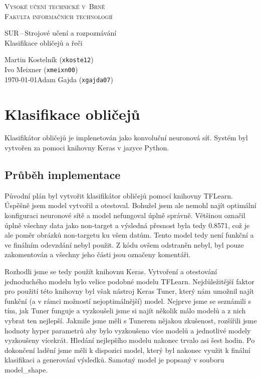 \documentclass[a4paper,11pt]{article}
\begin{document}
	\begin{titlepage}
		\begin{center}
			\textsc{\Huge Vysoké učení technické v~Brně\\
				\vspace{0.4em}\huge Fakulta informačních technologií}
			
			
			{\LARGE SUR\,--\,Strojové učení a rozpoznávání\\
				\Huge Klasifikace obličejů a řeči\\ \vspace{0.3em}}
			
			
			{\Large \hfill Martin Kostelník (\texttt{xkoste12})}\\
			{\Large \hfill Ivo Meixner (\texttt{xmeixn00})}\\
			{\Large \today \hfill Adam Gajda (\texttt{xgajda07})}
		\end{center}
	\end{titlepage}

	\section{Klasifikace obličejů}

		Klasifikátor obličejů je implenetován jako konvoluční neuronová síť. Systém byl vytvořen za pomoci knihovny Keras v jazyce Python.

		\subsection {Průběh implementace}
			Původní plán byl vytvořit klasifikátor obličejů pomocí knihovny TFLearn. Úspěšně jsem model vytvořil a otestoval. Bohužel jsem ale nemohl najít optimální konfiguraci neuronové sítě a model nefungoval úplně správně. Většinou označil úplně všechny data jako non-target a výsledná přesnost byla tedy 0.8571, což je ale poměr obrázků non-targetu ku všem datům. Tento model tedy není funkční a ve finálním odevzdání nebyl použit. Z kódu ovšem odstraněn nebyl, byl pouze zakomentován a všechny jeho části jsou označeny komentáři.
			
			\vspace{10pt}
			
			Rozhodli jsme se tedy použít knihovnu Keras. Vytvoření a otestování jednoduchého modelu bylo velice podobné modelu TFLearn. Nejdůležitější faktor pro použití této knihovny byl však nástroj Keras Tuner, který nám umožnil najít funkční (a v rámci možností nejoptimálnější) model. Nejprve jsme se seznámili s tím, jak Tuner funguje a vyzkoušeli jsme si najít několik málo modelů a z nich vybrat ten nejlepší. Jakmile jsme měli s Tunerem nějakou zkušenost, rozšířili jsme hodnoty hyper parametrů aby bylo vyzkoušeno více modelů a jednotlivé modely vyzkoušeny vícekrát. Hledání nejlepšího modelu nakonec trvalo asi šest hodin. Po dokončení ladění jsme měli k dispozici model, který byl nakonec využit k finální klasifikaci a generování výsledků. Samotný model je popsaný v souboru model\_shape.
			
\end{document}
